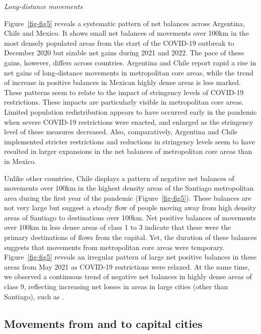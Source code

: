 \documentclass[
  10pt,
  letterpaper,
  DIV=11,
  numbers=noendperiod]{scrartcl}
\begin{document}
\emph{Long-distance movements}

Figure~\ref{fig-fig5} reveals a systematic pattern of net balances
across Argentina, Chile and Mexico. It shows small net balances of
movements over 100km in the most densely populated areas from the start
of the COVID-19 outbreak to December 2020 but sizable net gains during
2021 and 2022. The pace of these gains, however, differs across
countries. Argentina and Chile report rapid a rise in net gains of
long-distance movements in metropolitan core areas, while the trend of
increase in positive balances in Mexican highly dense areas is less
marked. These patterns seem to relate to the impact of stringency levels
of COVID-19 restrictions. These impacts are particularly visible in
metropolitan core areas. Limited population redistribution appears to
have occurred early in the pandemic when severe COVID-19 restrictions
were enacted, and enlarged as the stringency level of these measures
decreased. Also, comparatively, Argentina and Chile implemented stricter
restrictions and reductions in stringency levels seem to have resulted
in larger expansions in the net balances of metropolitan core areas than
in Mexico.

Unlike other countries, Chile displays a pattern of negative net
balances of movements over 100km in the highest density areas of the
Santiago metropolitan area during the first year of the pandemic
(Figure~\ref{fig-fig5}). These balances are not very large but suggest a
steady flow of people moving away from high density areas of Santiago to
destinations over 100km. Net positive balances of movements over 100km
in less dense areas of class 1 to 3 indicate that these were the primary
destinations of flows from the capital. Yet, the duration of these
balances suggests that movements from metropolitan core areas were
temporary. Figure~\ref{fig-fig5} reveals an irregular pattern of large
net positive balances in these areas from May 2021 as COVID-19
restrictions were relaxed. At the same time, we observed a continuous
trend of negative net balances in highly dense areas of class 9,
reflecting increasing net losses in areas in large cities (other than
Santiago), such as .

\hypertarget{movements-from-and-to-capital-cities}{%
\subsection{Movements from and to capital
cities}\label{movements-from-and-to-capital-cities}}
\end{document}
